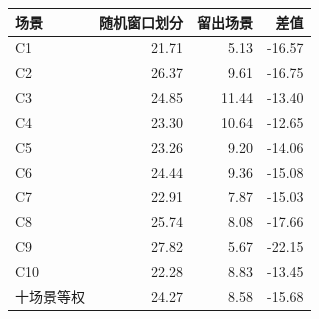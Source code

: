 \begin{tabular}{@{}lrrr@{}}
\toprule
场景 & 随机窗口划分 & 留出场景 & 差值\\
\midrule
C1 & 21.71 & 5.13 & -16.57 \\
C2 & 26.37 & 9.61 & -16.75 \\
C3 & 24.85 & 11.44 & -13.40 \\
C4 & 23.30 & 10.64 & -12.65 \\
C5 & 23.26 & 9.20 & -14.06 \\
C6 & 24.44 & 9.36 & -15.08 \\
C7 & 22.91 & 7.87 & -15.03 \\
C8 & 25.74 & 8.08 & -17.66 \\
C9 & 27.82 & 5.67 & -22.15 \\
C10 & 22.28 & 8.83 & -13.45 \\
\midrule
十场景等权 & 24.27 & 8.58 & -15.68 \\
\bottomrule
\end{tabular}
